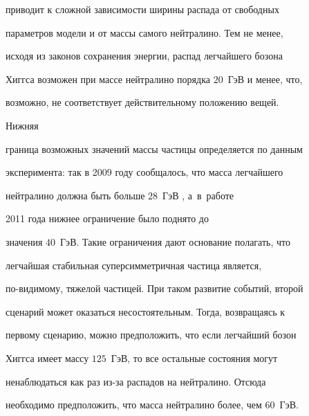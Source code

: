 приводит к сложной зависимости ширины распада от свободных

параметров модели и от массы самого нейтралино. Тем не менее,

исходя из законов сохранения энергии, распад легчайшего бозона

Хиггса возможен при массе нейтралино порядка $20$~ГэВ и менее, что,

возможно, не соответствует действительному положению вещей. 

Нижняя

граница возможных значений массы частицы определяется по данным

эксперимента:  так в 2009 году сообщалось, что масса легчайшего

нейтралино должна быть больше $28$~ГэВ \cite{Vasquez}, а~в~работе

\cite{Geringer-Sameth} 2011 года нижнее ограничение было поднято до

значения $40$~ГэВ. Такие ограничения дают основание полагать, что

легчайшая стабильная суперсимметричная частица является,

по-видимому, тяжелой частицей. При таком развитие событий, второй

сценарий может оказаться несостоятельным. Тогда, возвращаясь к

первому сценарию, можно предположить, что если легчайший бозон

Хиггса имеет массу $125$~ГэВ, то все остальные состояния могут

ненаблюдаться как раз из-за распадов на нейтралино. Отсюда

необходимо предположить, что масса нейтралино более, чем $60$~ГэВ.














